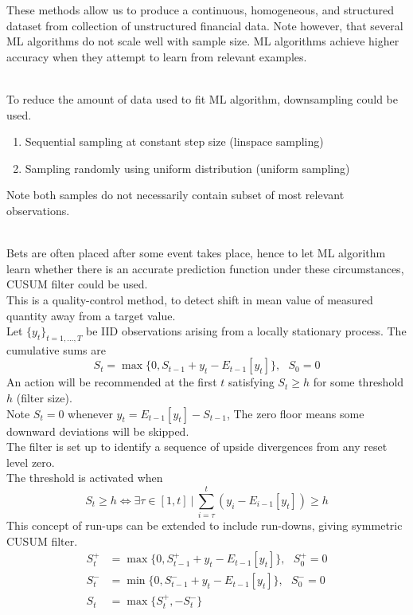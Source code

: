 \documentclass[a4paper,oneside,openany]{book}
\begin{document}
These methods allow us to produce a continuous, homogeneous, and structured dataset from collection of unstructured financial data. Note however, that several ML algorithms do not scale well with sample size. ML algorithms achieve higher accuracy when they attempt to learn from relevant examples.

\begin{method} \\
To reduce the amount of data used to fit ML algorithm, downsampling could be used.
\begin{enumerate}[label=\roman*.]
\setlength{\itemsep}{0pt}
\item Sequential sampling at constant step size (linspace sampling)
\item Sampling randomly using uniform distribution (uniform sampling)
\end{enumerate}
Note both samples do not necessarily contain subset of most relevant observations.
\end{method}

\begin{method}  \\
Bets are often placed after some event takes place, hence to let ML algorithm learn whether there is an accurate prediction function under these circumstances, CUSUM filter could be used.\\
This is a quality-control method, to detect shift in mean value of measured quantity away from a target value.\\
Let $\{y_t\}_{t=1, \ldots, T}$ be IID observations arising from a locally stationary process. The cumulative sums are
\begin{equation*}
S_t = \max \{0, S_{t-1} + y_t - E_{t-1} [y_t] \}, \ \ \ S_0 = 0 \nonumber
\end{equation*}
An action will be recommended at the first $t$ satisfying $S_t \geq h$ for some threshold $h$ (filter size).\\
Note $S_t = 0$ whenever $y_t = E_{t-1}[y_t] - S_{t-1}$, The zero floor means some downward deviations will be skipped.\\
The filter is set up to identify a sequence of upside divergences from any reset level zero.\\
The threshold is activated when
\begin{equation*}
S_t \geq h \Leftrightarrow \exists \tau \in [1, t] \ \vert \ \sum\limits_{i=\tau}^t (y_i - E_{i-1}[y_t]) \geq h \nonumber
\end{equation*}
This concept of run-ups can be extended to include run-downs, giving symmetric CUSUM filter.
\begin{align}
S^+_t &= \max \{0, S^+_{t-1} + y_t - E_{t-1}[y_t] \}, \ \ \ S^+_0 = 0 \nonumber \\
S^-_t &= \min \{0, S^-_{t-1} + y_t - E_{t-1}[y_t] \}, \ \ \ S^-_0 = 0 \nonumber \\
S_t &= \max \{S^+_t, -S^-_t \} \nonumber
\end{align}
\end{method}
\end{document}
